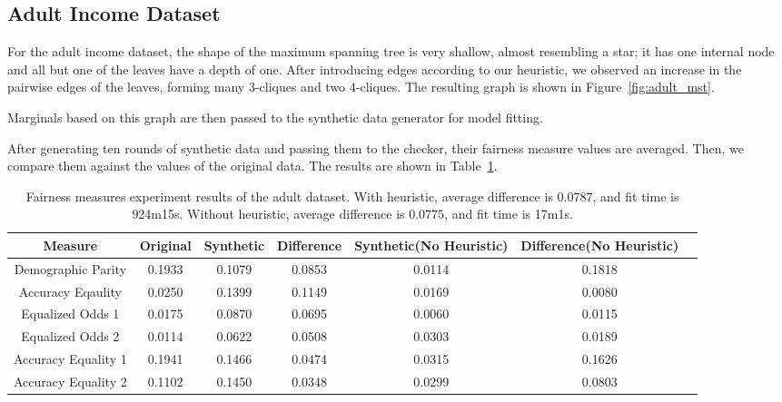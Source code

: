 \documentclass[manuscript,screen,review,anonymous]{acmart}
\begin{document}
\subsection{Adult Income Dataset}

For the adult income dataset, the shape of the maximum spanning tree is very shallow, almost resembling a star; it has one internal node and all but one of the leaves have a depth of one. After introducing edges according to our heuristic, we observed an increase in the pairwise edges of the leaves, forming many 3-cliques and two 4-cliques. The resulting graph is shown in Figure~\ref{fig:adult_mst}.

Marginals based on this graph are then passed to the synthetic data generator for model fitting.

After generating ten rounds of synthetic data and passing them to the checker, their fairness measure values are averaged. Then, we compare them against the values of the original data. The results are shown in Table~\ref{tab:adult_score}.


\begin{table}[h]
\caption{
    Fairness measures experiment results of the adult dataset.
    With heuristic, average difference is $0.0787$, and fit time is 924m15s.
    Without heuristic, average difference is $0.0775$, and fit time is 17m1s.
}
\label{tab:adult_score}
\begin{tabular}{ccccccc}
\toprule
\textbf{Measure} & \textbf{Original} & \textbf{Synthetic} & \textbf{Difference} & \textbf{Synthetic(No Heuristic)} & \textbf{Difference(No Heuristic)} \\
\midrule
Demographic Parity  & 0.1933 & 0.1079 & 0.0853 & 0.0114 & 0.1818 \\
Accuracy Eqaulity   & 0.0250 & 0.1399 & 0.1149 & 0.0169 & 0.0080 \\
Equalized Odds 1    & 0.0175 & 0.0870 & 0.0695 & 0.0060 & 0.0115 \\
Equalized Odds 2    & 0.0114 & 0.0622 & 0.0508 & 0.0303 & 0.0189 \\
Accuracy Equality 1 & 0.1941 & 0.1466 & 0.0474 & 0.0315 & 0.1626 \\
Accuracy Equality 2 & 0.1102 & 0.1450 & 0.0348 & 0.0299 & 0.0803 \\
\bottomrule
\end{tabular}
\end{table}
\end{document}
